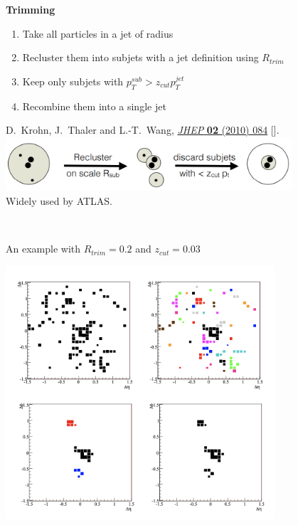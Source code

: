 \documentclass[9pt,a4paper,unknownkeysallowed,xcolor=dvipsnames,aspectratio=43]{beamer}
\begin{document}
%
%
\begin{frame}{\bf \huge Trimming}

\begin{enumerate}
    \item Take all particles in a jet of radius
    \vspace{4mm}
    \item Recluster them into subjets with a jet definition using $R_{trim}$
    \vspace{4mm}
    \item Keep only subjets with $p_T^{sub} > z_{cut} p_T^{jet}$
    \vspace{4mm}
    \item Recombine them into a single jet
\end{enumerate}
\vspace{2mm}
\begin{center}
{\tiny \color{teablue} D.~Krohn, J.~Thaler and L.-T.~Wang, %
  \href{https://doi.org/10.1007/JHEP02(2010)084}{\emph{JHEP} {\bfseries 02}
  (2010) 084} [\href{https://arxiv.org/abs/0912.1342}{{}}].}\\
  \vspace{8mm}
\includegraphics[width=0.8\textwidth]{05/trimming.PNG}
\\\vspace{4mm} Widely used by ATLAS.
\end{center}
\end{frame}
%
%
\begin{frame}\\\vspace{2mm}

An example with $R_{trim}=0.2$ and $z_{cut}=0.03$
\begin{center}

\includegraphics[width=0.75\textwidth]{05/trimmingeg.PNG}
\end{center}
\end{frame}
\end{document}
